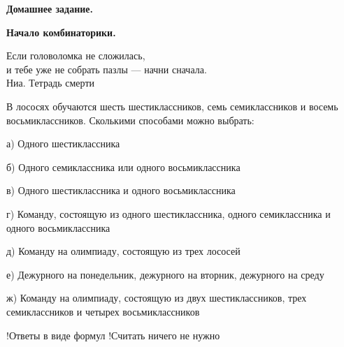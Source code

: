 \centerline{\bf \Huge Домашнее задание.}
\centerline{\bf \Huge Начало комбинаторики.}

\begin{flushright}
        \scriptsize{Если головоломка не сложилась,\\ и тебе уже не собрать пазлы — начни сначала. \\Ниа. Тетрадь смерти}
\end{flushright}

В лососях обучаются шесть шестиклассников, семь семиклассников и восемь восьмиклассников.
Сколькими способами можно выбрать:

а) Одного шестиклассника

б) Одного семиклассника или одного восьмиклассника

в) Одного шестиклассника и одного восьмиклассника

г) Команду, состоящую из одного шестиклассника, одного семиклассника и одного восьмиклассника

д) Команду на олимпиаду, состоящую из трех лососей

е) Дежурного на понедельник, дежурного на вторник, дежурного на среду

ж) Команду на олимпиаду, состоящую из двух шестиклассников, трех семиклассников и четырех восьмиклассников

!Ответы в виде формул
!Считать ничего не нужно